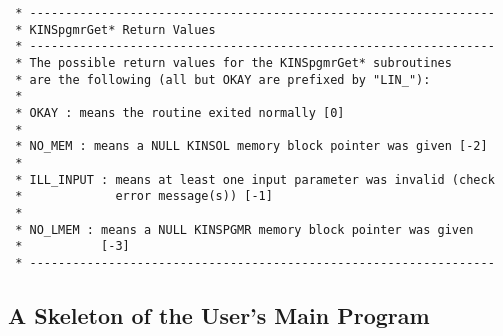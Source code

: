 \documentclass[11pt]{article}
\begin{document}
\begin{verbatim}
 * -----------------------------------------------------------------
 * KINSpgmrGet* Return Values
 * -----------------------------------------------------------------
 * The possible return values for the KINSpgmrGet* subroutines
 * are the following (all but OKAY are prefixed by "LIN_"):
 *
 * OKAY : means the routine exited normally [0]
 *
 * NO_MEM : means a NULL KINSOL memory block pointer was given [-2]
 *
 * ILL_INPUT : means at least one input parameter was invalid (check
 *             error message(s)) [-1]
 *
 * NO_LMEM : means a NULL KINSPGMR memory block pointer was given
 *           [-3]
 * -----------------------------------------------------------------

\end{verbatim}
\normalsize
\subsection{A Skeleton of the User's Main Program}
\end{document}
